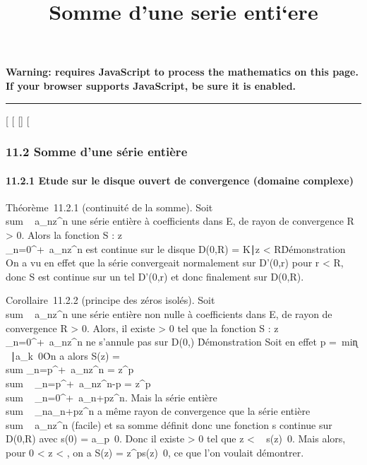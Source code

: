 \documentclass[]{article}
\title{Somme d'une serie enti`ere}
\author{}
\date{}
\begin{document}
\maketitle

\textbf{Warning: 
requires JavaScript to process the mathematics on this page.\\ If your
browser supports JavaScript, be sure it is enabled.}

\begin{center}\rule{3in}{0.4pt}\end{center}

{[}
{[}
{[}{]}
{[}

\subsubsection{11.2 Somme d'une série entière}

\paragraph{11.2.1 Etude sur le disque ouvert de convergence (domaine
complexe)}

Théorème~11.2.1 (continuité de la somme). Soit
\\sum ~
a_nz^n une série entière à coefficients dans E, de
rayon de convergence R \textgreater{} 0. Alors la fonction S :
z\mapsto~\\\sum
 _n=0^+\infty~a_nz^n est continue sur le
disque D(0,R) = \z \in
K∣z \textless{}
R\.

Démonstration On a vu en effet que la série convergeait normalement sur
D'(0,r) pour r \textless{} R, donc S est continue sur un tel D'(0,r) et
donc finalement sur D(0,R).

Corollaire~11.2.2 (principe des zéros isolés). Soit
\\sum ~
a_nz^n une série entière non nulle à coefficients
dans E, de rayon de convergence R \textgreater{} 0. Alors, il existe \eta
\textgreater{} 0 tel que la fonction S :
z\mapsto~\\\sum
 _n=0^+\infty~a_nz^n ne s'annule pas sur
D(0,\eta) \diagdown\0\.

Démonstration Soit en effet p =\
min\k \in
{}~∣a_k\mathrel\neq~0\.
On a alors S(z) =\ \\sum
 _n=p^+\infty~a_nz^n =
z^p \\sum ~
_n=p^+\infty~a_nz^n-p =
z^p \\sum ~
_n=0^+\infty~a_n+pz^n. Mais la série entière
\\sum ~
_na_n+pz^n a même rayon de convergence que la
série entière \\sum ~
a_nz^n (facile) et sa somme définit donc une
fonction s continue sur D(0,R) avec s(0) =
a_p\neq~0. Donc il existe \eta
\textgreater{} 0 tel que z \textless{} \eta \rigtharrow~
s(z)\neq~0. Mais alors, pour 0 \textless{}
z \textless{} \eta, on a S(z) =
z^ps(z)\neq~0, ce que l'on voulait
démontrer.
\end{document}
